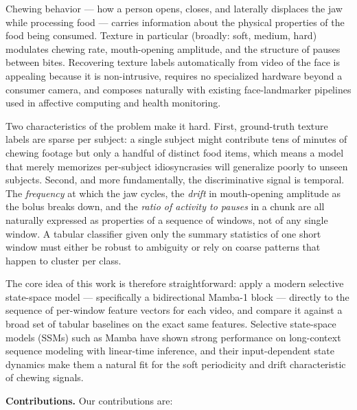 \documentclass{article}
\begin{document}
Chewing behavior --- how a person opens, closes, and laterally displaces the jaw while processing food --- carries information about the physical properties of the food being consumed. Texture in particular (broadly: soft, medium, hard) modulates chewing rate, mouth-opening amplitude, and the structure of pauses between bites. Recovering texture labels automatically from video of the face is appealing because it is non-intrusive, requires no specialized hardware beyond a consumer camera, and composes naturally with existing face-landmarker pipelines used in affective computing and health monitoring.

Two characteristics of the problem make it hard. First, ground-truth texture labels are sparse per subject: a single subject might contribute tens of minutes of chewing footage but only a handful of distinct food items, which means a model that merely memorizes per-subject idiosyncrasies will generalize poorly to unseen subjects. Second, and more fundamentally, the discriminative signal is temporal. The \emph{frequency} at which the jaw cycles, the \emph{drift} in mouth-opening amplitude as the bolus breaks down, and the \emph{ratio of activity to pauses} in a chunk are all naturally expressed as properties of a sequence of windows, not of any single window. A tabular classifier given only the summary statistics of one short window must either be robust to ambiguity or rely on coarse patterns that happen to cluster per class.

The core idea of this work is therefore straightforward: apply a modern selective state-space model --- specifically a bidirectional Mamba-1 block --- directly to the sequence of per-window feature vectors for each video, and compare it against a broad set of tabular baselines on the exact same features. Selective state-space models (SSMs) such as Mamba \cite{gu2023mamba} have shown strong performance on long-context sequence modeling with linear-time inference, and their input-dependent state dynamics make them a natural fit for the soft periodicity and drift characteristic of chewing signals.

\textbf{Contributions.} Our contributions are:
\end{document}
